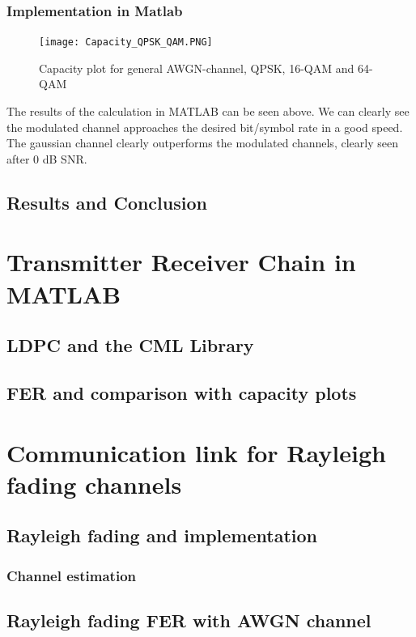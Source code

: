 \documentclass[12pt,oneside, reqno]{report}
\begin{document}
\subsection{Implementation in Matlab}
\begin{figure}[H]
	\centering
	\texttt{[image: Capacity\_QPSK\_QAM.PNG]}
	\caption{Capacity plot for general AWGN-channel, QPSK, 16-QAM and 64-QAM}
	\label{fig:Modulation}
\end{figure}
The results of the calculation in MATLAB can be seen above. We can clearly see the modulated channel approaches the desired bit/symbol rate in a good speed. The gaussian channel clearly outperforms the modulated channels, clearly seen after 0 dB SNR.




\section{Results and Conclusion}



\chapter{Transmitter Receiver Chain in MATLAB}




\section{LDPC and the CML Library}


\section{FER and comparison with capacity plots}


\chapter{Communication link for Rayleigh fading channels}

\section{Rayleigh fading and implementation}

\subsection{Channel estimation}

\section{Rayleigh fading FER with AWGN channel}
\end{document}
